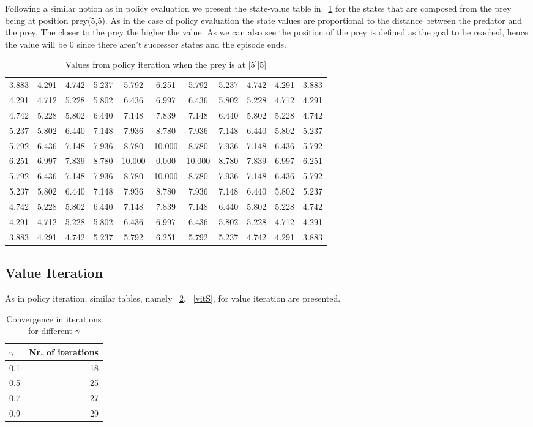 \documentclass[paper=a4, fontsize=11pt]{scrartcl}
\numberwithin{equation}{section}		%
\numberwithin{figure}{section}			%
\numberwithin{table}{section}				%
\begin{document}
Following a similar notion as in policy evaluation we present the state-value table in ~\ref{pitS} for the states that are composed from the prey being at position prey(5,5). As in the case of policy evaluation the state values are proportional to the distance between the predator and the prey. The closer to the prey the higher the value. As we can also see the position of the prey is defined as the goal to be reached, hence the value will be 0 since there aren't successor states and the episode ends.

\begin{table}[H]
\caption{Values from policy iteration when the prey is at [5][5]}
\centering
\begin{tabular}{l*{9}{c}r}
  \hline
3.883 & 4.291 & 4.742 & 5.237 & 5.792 & 6.251 & 5.792 & 5.237 & 4.742 & 4.291 & 3.883  \\
4.291 & 4.712 & 5.228 & 5.802 & 6.436 & 6.997 & 6.436 & 5.802 & 5.228 & 4.712 & 4.291  \\
4.742 & 5.228 & 5.802 & 6.440 & 7.148 & 7.839 & 7.148 & 6.440 & 5.802 & 5.228 & 4.742  \\
5.237 & 5.802 & 6.440 & 7.148 & 7.936 & 8.780 & 7.936 & 7.148 & 6.440 & 5.802 & 5.237  \\
5.792 & 6.436 & 7.148 & 7.936 & 8.780 & 10.000 & 8.780 & 7.936 & 7.148 & 6.436 & 5.792  \\
6.251 & 6.997 & 7.839 & 8.780 & 10.000 & 0.000 & 10.000 & 8.780 & 7.839 & 6.997 & 6.251  \\
5.792 & 6.436 & 7.148 & 7.936 & 8.780 & 10.000 & 8.780 & 7.936 & 7.148 & 6.436 & 5.792  \\
5.237 & 5.802 & 6.440 & 7.148 & 7.936 & 8.780 & 7.936 & 7.148 & 6.440 & 5.802 & 5.237  \\
4.742 & 5.228 & 5.802 & 6.440 & 7.148 & 7.839 & 7.148 & 6.440 & 5.802 & 5.228 & 4.742  \\
4.291 & 4.712 & 5.228 & 5.802 & 6.436 & 6.997 & 6.436 & 5.802 & 5.228 & 4.712 & 4.291  \\
3.883 & 4.291 & 4.742 & 5.237 & 5.792 & 6.251 & 5.792 & 5.237 & 4.742 & 4.291 & 3.883
\end{tabular}
\label{pitS}
\end{table}

\subsection{Value Iteration}
As in policy iteration, similar tables, namely ~\ref{convVIter}, ~\ref{vitS}, for value iteration are presented. 
\begin{table}[H]
\caption{Convergence in iterations for different $\gamma$}
\centering
\begin{tabular}{|l||r|}
\hline
$\gamma$ & Nr. of iterations\\
\hline
0.1& 18\\
\hline
0.5& 25\\
\hline
0.7& 27\\
\hline
0.9& 29\\
\hline
\end{tabular}
\label{convVIter}
\end{table}
\end{document}
